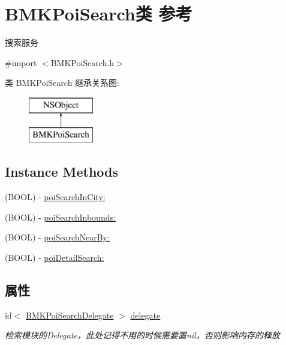 \hypertarget{interface_b_m_k_poi_search}{\section{B\+M\+K\+Poi\+Search类 参考}
\label{interface_b_m_k_poi_search}
}


搜索服务  




{\ttfamily \#import $<$B\+M\+K\+Poi\+Search.\+h$>$}

类 B\+M\+K\+Poi\+Search 继承关系图\+:\begin{figure}[H]
\begin{center}
\leavevmode
\includegraphics[height=2.000000cm]{interface_b_m_k_poi_search}
\end{center}
\end{figure}
\subsection*{Instance Methods}
\begin{DoxyCompactItemize}
\item 
(B\+O\+O\+L) -\/ \hyperlink{interface_b_m_k_poi_search_afd3f3ed4e5193e71ec0efada3172991e}{poi\+Search\+In\+City\+:}
\item 
(B\+O\+O\+L) -\/ \hyperlink{interface_b_m_k_poi_search_a6da39f1518d0dba9df8c31a1fd90b44f}{poi\+Search\+Inbounds\+:}
\item 
(B\+O\+O\+L) -\/ \hyperlink{interface_b_m_k_poi_search_a7abe377e0a0609058d5db2236b33aff1}{poi\+Search\+Near\+By\+:}
\item 
(B\+O\+O\+L) -\/ \hyperlink{interface_b_m_k_poi_search_aae3c3917b12d0212a78a90d4206b8e17}{poi\+Detail\+Search\+:}
\end{DoxyCompactItemize}
\subsection*{属性}
\begin{DoxyCompactItemize}
\item 
\hypertarget{interface_b_m_k_poi_search_a5cf63a1ba785de9592b81ba28acf90e4}{id$<$ \hyperlink{protocol_b_m_k_poi_search_delegate-p}{B\+M\+K\+Poi\+Search\+Delegate} $>$ \hyperlink{interface_b_m_k_poi_search_a5cf63a1ba785de9592b81ba28acf90e4}{delegate}}\label{interface_b_m_k_poi_search_a5cf63a1ba785de9592b81ba28acf90e4}

\begin{DoxyCompactList}\small\item\em 检索模块的\+Delegate，此处记得不用的时候需要置nil，否则影响内存的释放 \end{DoxyCompactList}\end{DoxyCompactItemize}


